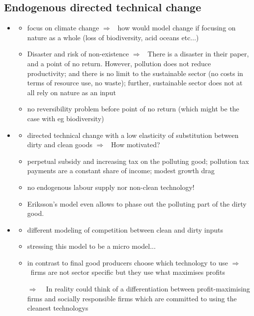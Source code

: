 \documentclass[12pt]{article}
\newcommand{\ar}{$\Rightarrow$ \ }
\begin{document}
\subsection{Endogenous directed technical change}
\begin{itemize}
	\item \cite{Acemoglu2012TheChange}
	\begin{itemize}
		\item focus on climate change \ar how would model change if focusing on nature as a whole (loss of biodiversity, acid oceans etc...)
\item 	Disaster and risk of non-existence \ar There is a disaster in their paper, and a point of no return. However, pollution does not reduce productivity; and there is no limit to the sustainable sector (no costs in terms of resource use, no waste); further, sustainable sector does not at all rely on nature as an input
\item no reversibility problem before point of no return (which might be the case with eg biodiversity)
	\end{itemize}	
	\item \cite{Eriksson2018PhasingChange}
	\begin{itemize}
\item directed technical change with  a low elasticity of substitution between dirty and clean goods \ar How motivated?
\item perpetual subsidy and increasing tax on the polluting good; pollution tax payments are a constant share of income; modest growth drag
\item no endogenous labour supply nor non-clean technology!
\item Eriksson's model even allows to phase out the polluting part of the dirty good. 
	\end{itemize}
\item \cite{Acemoglu2016TransitionTechnology}
\begin{itemize}
	\item different modeling of competition between clean and dirty inputs
	\item stressing this model to be a micro model...
	\item in contrast to \cite{Acemoglu2012TheChange} final good producers choose which technology to use \ar firms are not sector specific but they use what maximises profits 
	\item[\ar] In reality could think of a differentiation between profit-maximising firms and socially responsible firms which are committed to using the cleanest technologys
\end{itemize}
\end{itemize} 
\end{document}
